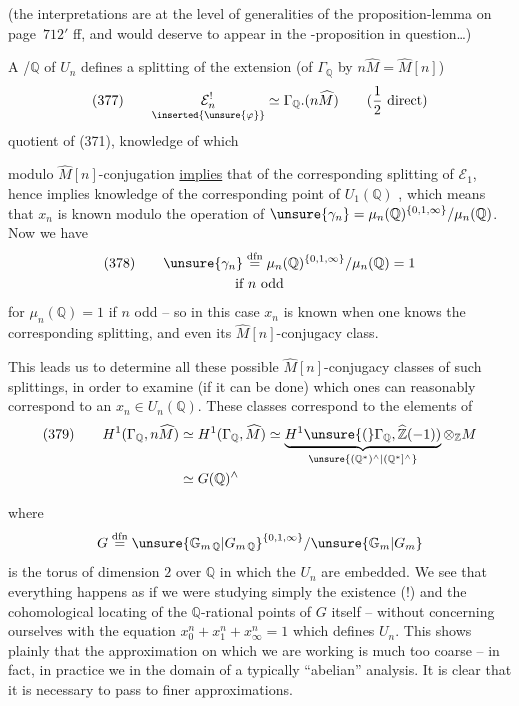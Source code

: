 (the interpretations are at the level of generalities of the proposition-lemma on page~$712'$ ff, and would deserve to appear in the -proposition in question\ldots)

A   /$\mathbb Q$ of $U_n$ defines a splitting of the extension (of $\Gamma_{\mathbb Q}$ by $n\widehat M=\widehat M[n]$)
\[
\text{(377)}\qquad \underset{\inserted{\unsure{\varphi}}}{\mathcal E_n^{!}}\simeq\Gamma_{\mathbb Q}.(n\widehat M)
\qquad\text{($\frac12$ direct)}
\]
quotient of (371), knowledge of which

modulo  $\widehat M[n]$-conjugation \uline{implies} that
of the corresponding splitting of $\mathcal E_1$, hence
implies knowledge of the corresponding point 
of $U_1(\mathbb Q)$ , which means
that $x_n$ is known modulo the operation of
$\unsure{\gamma_n}=\mu_n(\mathbb Q)^{\{0,1,\infty\}}/\mu_n(\mathbb Q)$.
Now we have
\[
\begin{gathered}
\text{(378)}\qquad
\unsure{\gamma_n}\overset{\mathrm{dfn}}=
\mu_n(\mathbb Q)^{\{0,1,\infty\}}/\mu_n(\mathbb Q)=1\\
\text{if }n\text{ odd}
\end{gathered}
\]
for $\mu_n(\mathbb Q)=1$ if $n$ odd -- so in
this case $x_n$ is known when one knows
the corresponding splitting, and even
 its $\widehat M[n]$-conjugacy class.

This leads us to determine all these
possible $\widehat M[n]$-conjugacy classes of
such splittings, in order to examine (if it can be
done) which ones can reasonably
correspond to an $x_n\in U_n(\mathbb Q)$. These classes
correspond to the elements of
\[
\begin{aligned}
\text{(379)}\qquad
H^1(\Gamma_{\mathbb Q},n\widehat M)
&\simeq H^1(\Gamma_{\mathbb Q},\widehat M)
\simeq
\underbrace{H^1\unsure{(}\Gamma_{\mathbb Q},\widehat{\mathbb Z}(-1))}
_{\unsure{(\mathbb Q^*)^\wedge|(\mathbb Q^*]^\wedge}}
\otimes_{\mathbb Z}M\\
&\simeq G(\mathbb Q)^\wedge
\end{aligned}
\]


where
\[
G\overset{\mathrm{dfn}}=
\unsure{\mathbb G_{m\,\mathbb Q}|G_{m\,\mathbb Q}}^{\{0,1,\infty\}}
/\unsure{\mathbb G_m|G_m}
\]
is the torus of dimension $2$ over $\mathbb Q$ in which
the $U_n$ are embedded. We see that
everything happens as if we were studying
simply the existence (!) and the cohomological
locating of the $\mathbb Q$-rational points of
$G$ itself -- without concerning ourselves
with the equation $x_0^n+x_1^n+x_\infty^n=1$ which defines
$U_n$. This shows plainly that
the approximation on which we are working
is much too coarse -- in fact,
in practice we  in the
domain of a typically
``abelian'' analysis. It is clear that it is
necessary to pass to finer
approximations.

